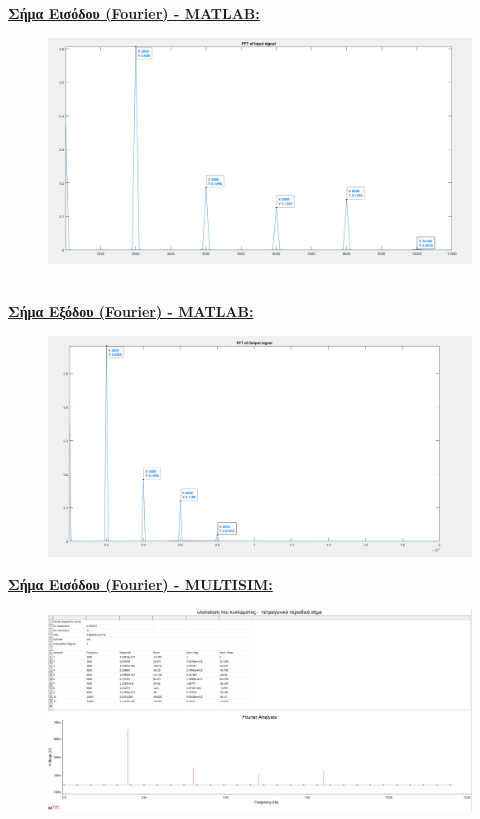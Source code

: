 \documentclass{article}
\begin{document}
{\clearpage
\textbf{\underline{Σήμα Εισόδου (Fourier) - MATLAB:}}
\begin{figure}[h!]
\centering
 	\advance\leftskip-2.2cm
  \includegraphics[width=150mm,scale=2]{multisim8_input.png}
\end{figure} \\[1.4\baselineskip]
\textbf{\underline{Σήμα Εξόδου (Fourier) - MATLAB:}}
\begin{figure}[h!]
\centering
 	\advance\leftskip-2.2cm
  \includegraphics[width=150mm,scale=2]{multisim9_output.png}
\end{figure} 
\clearpage
\textbf{\underline{Σήμα Εισόδου (Fourier) - MULTISIM:}}
\begin{figure}[h!]
\centering
 	\advance\leftskip-2cm
  \includegraphics[width=160mm,scale=2]{multisim9.png}

\end{figure}}
\end{document}
